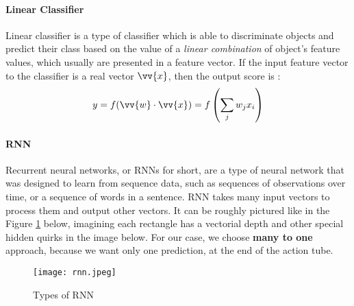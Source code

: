 \paragraph{Linear Classifier} Linear classifier is a type of classifier which is able to discriminate objects and predict their
class based on the value of a \textit{linear combination} of object's feature values, which usually are presented in a feature
vector. If the input feature vector to the classifier is a real vector  $\vv{x}$, then the output score is :
\[ y = f(\vv{w} \cdot \vv{x}) = f \left( \sum_j w_jx_i \right) \]
\paragraph{RNN}
Recurrent neural networks, or RNNs for short, are a type of neural network that was designed to learn from sequence data,
such as sequences of observations over time, or a sequence of words in a sentence.
RNN takes many input vectors to process them and output other vectors.
It can be roughly pictured like in the Figure \ref{fig:rnn} below,
imagining each rectangle has a vectorial depth and other special hidden quirks in the image below.
For our case, we choose \textbf{many to one} approach, because we want only one prediction, at the end of
the action tube. \par
\begin{figure}[h]
  \centering
  \texttt{[image: rnn.jpeg]}
  \caption{Types of RNN}
  \label{fig:rnn}
\end{figure}

